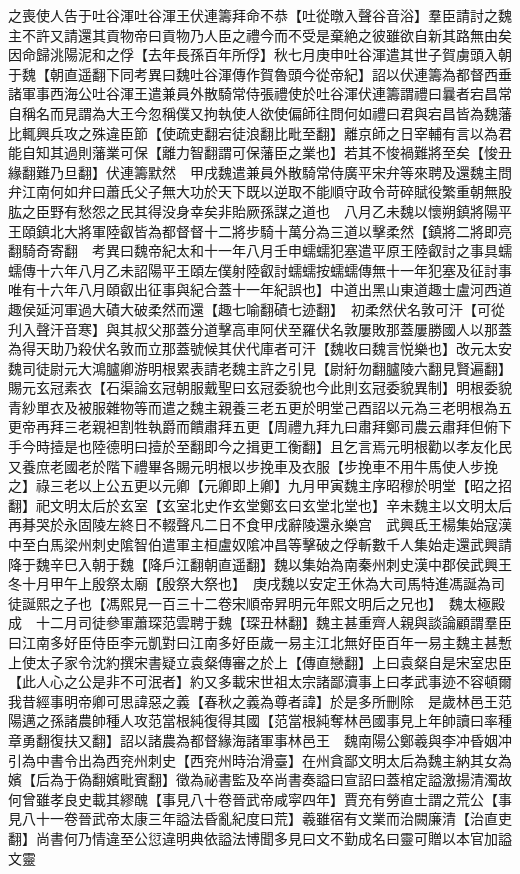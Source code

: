 之喪使人告于吐谷渾吐谷渾王伏連籌拜命不恭【吐從暾入聲谷音浴】羣臣請討之魏主不許又請還其貢物帝曰貢物乃人臣之禮今而不受是棄絶之彼雖欲自新其路無由矣因命歸洮陽泥和之俘【去年長孫百年所俘】秋七月庚申吐谷渾遣其世子賀虜頭入朝于魏【朝直遥翻下同考異曰魏吐谷渾傳作賀魯頭今從帝紀】詔以伏連籌為都督西垂諸軍事西海公吐谷渾王遣兼員外散騎常侍張禮使於吐谷渾伏連籌謂禮曰曩者宕昌常自稱名而見謂為大王今忽稱僕又拘執使人欲使偏師往問何如禮曰君與宕昌皆為魏藩比輒興兵攻之殊違臣節【使疏吏翻宕徒浪翻比毗至翻】離京師之日宰輔有言以為君能自知其過則藩業可保【離力智翻謂可保藩臣之業也】若其不悛禍難將至矣【悛丑緣翻難乃旦翻】伏連籌默然　甲戌魏遣兼員外散騎常侍廣平宋弁等來聘及還魏主問弁江南何如弁曰蕭氏父子無大功於天下既以逆取不能順守政令苛碎賦役繁重朝無股肱之臣野有愁怨之民其得没身幸矣非貽厥孫謀之道也　八月乙未魏以懷朔鎮將陽平王頤鎮北大將軍陸叡皆為都督督十二將步騎十萬分為三道以擊柔然【鎮將二將即亮翻騎奇寄翻　考異曰魏帝紀太和十一年八月壬申蠕蠕犯塞遣平原王陸叡討之事具蠕蠕傳十六年八月乙未詔陽平王頤左僕射陸叡討蠕蠕按蠕蠕傳無十一年犯塞及征討事唯有十六年八月頤叡出征事與紀合蓋十一年紀誤也】中道出黑山東道趣士盧河西道趣侯延河軍過大磧大破柔然而還【趣七喻翻磧七迹翻】　初柔然伏名敦可汗【可從刋入聲汗音寒】與其叔父那蓋分道擊高車阿伏至羅伏名敦屢敗那蓋屢勝國人以那蓋為得天助乃殺伏名敦而立那蓋號候其伏代庫者可汗【魏收曰魏言悦樂也】改元太安　魏司徒尉元大鴻臚卿游明根累表請老魏主許之引見【尉紆勿翻臚陵六翻見賢遍翻】賜元玄冠素衣【石渠論玄冠朝服戴聖曰玄冠委貌也今此則玄冠委貌異制】明根委貌青紗單衣及被服雜物等而遣之魏主親養三老五更於明堂己酉詔以元為三老明根為五更帝再拜三老親袒割牲執爵而饋肅拜五更【周禮九拜九曰肅拜鄭司農云肅拜但俯下手今時撎是也陸德明曰撎於至翻即今之揖更工衡翻】且乞言焉元明根勸以孝友化民又養庶老國老於階下禮畢各賜元明根以步挽車及衣服【步挽車不用牛馬使人步挽之】祿三老以上公五更以元卿【元卿即上卿】九月甲寅魏主序昭穆於明堂【昭之招翻】祀文明太后於玄室【玄室北史作玄堂鄭玄曰玄堂北堂也】辛未魏主以文明太后再朞哭於永固陵左終日不輟聲凡二日不食甲戌辭陵還永樂宫　武興氐王楊集始寇漢中至白馬梁州刺史隂智伯遣軍主桓盧奴隂冲昌等擊破之俘斬數千人集始走還武興請降于魏辛巳入朝于魏【降戶江翻朝直遥翻】魏以集始為南秦州刺史漢中郡侯武興王　冬十月甲午上殷祭太廟【殷祭大祭也】　庚戌魏以安定王休為大司馬特進馮誕為司徒誕熙之子也【馮熙見一百三十二卷宋順帝昇明元年熙文明后之兄也】　魏太極殿成　十二月司徒參軍蕭琛范雲聘于魏【琛丑林翻】魏主甚重齊人親與談論顧謂羣臣曰江南多好臣侍臣李元凱對曰江南多好臣歲一易主江北無好臣百年一易主魏主甚慙　上使太子家令沈約撰宋書疑立袁粲傳審之於上【傳直戀翻】上曰袁粲自是宋室忠臣【此人心之公是非不可泯者】約又多載宋世祖太宗諸鄙瀆事上曰孝武事迹不容頓爾我昔經事明帝卿可思諱惡之義【春秋之義為尊者諱】於是多所刪除　是歲林邑王范陽邁之孫諸農帥種人攻范當根純復得其國【范當根純奪林邑國事見上年帥讀曰率種章勇翻復扶又翻】詔以諸農為都督緣海諸軍事林邑王　魏南陽公鄭羲與李冲昏姻冲引為中書令出為西兖州刺史【西兖州時治滑臺】在州貪鄙文明太后為魏主納其女為嬪【后為于偽翻嬪毗賓翻】徵為祕書監及卒尚書奏謚曰宣詔曰蓋棺定謚激揚清濁故何曾雖孝良史載其繆醜【事見八十卷晉武帝咸寜四年】賈充有勞直士謂之荒公【事見八十一卷晉武帝太康三年謚法昏亂紀度曰荒】羲雖宿有文業而治闕廉清【治直吏翻】尚書何乃情違至公愆違明典依謚法博聞多見曰文不勤成名曰靈可贈以本官加謚文靈

